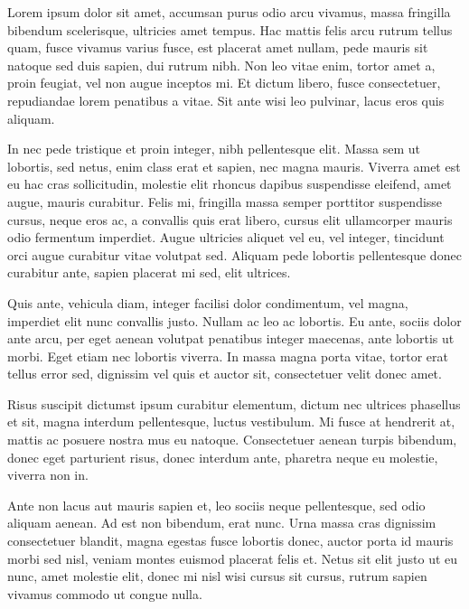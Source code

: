 \documentclass[11pt, a4paper]{TMR}
\begin{document}
\begin{coverletter}

Lorem ipsum dolor sit amet, accumsan purus odio arcu vivamus, massa fringilla bibendum scelerisque, ultricies amet tempus. Hac mattis felis arcu rutrum tellus quam, fusce vivamus varius fusce, est placerat amet nullam, pede mauris sit natoque sed duis sapien, dui rutrum nibh. Non leo vitae enim, tortor amet a, proin feugiat, vel non augue inceptos mi. Et dictum libero, fusce consectetuer, repudiandae lorem penatibus a vitae. Sit ante wisi leo pulvinar, lacus eros quis aliquam. 

In nec pede tristique et proin integer, nibh pellentesque elit. Massa sem ut lobortis, sed netus, enim class erat et sapien, nec magna mauris. Viverra amet est eu hac cras sollicitudin, molestie elit rhoncus dapibus suspendisse eleifend, amet augue, mauris curabitur. Felis mi, fringilla massa semper porttitor suspendisse cursus, neque eros ac, a convallis quis erat libero, cursus elit ullamcorper mauris odio fermentum imperdiet. Augue ultricies aliquet vel eu, vel integer, tincidunt orci augue curabitur vitae volutpat sed. Aliquam pede lobortis pellentesque donec curabitur ante, sapien placerat mi sed, elit ultrices.

Quis ante, vehicula diam, integer facilisi dolor condimentum, vel magna, imperdiet elit nunc convallis justo. Nullam ac leo ac lobortis. Eu ante, sociis dolor ante arcu, per eget aenean volutpat penatibus integer maecenas, ante lobortis ut morbi. Eget etiam nec lobortis viverra. In massa magna porta vitae, tortor erat tellus error sed, dignissim vel quis et auctor sit, consectetuer velit donec amet. 

Risus suscipit dictumst ipsum curabitur elementum, dictum nec ultrices phasellus et sit, magna interdum pellentesque, luctus vestibulum. Mi fusce at hendrerit at, mattis ac posuere nostra mus eu natoque. Consectetuer aenean turpis bibendum, donec eget parturient risus, donec interdum ante, pharetra neque eu molestie, viverra non in.

 Ante non lacus aut mauris sapien et, leo sociis neque pellentesque, sed odio aliquam aenean. Ad est non bibendum, erat nunc. Urna massa cras dignissim consectetuer blandit, magna egestas fusce lobortis donec, auctor porta id mauris morbi sed nisl, veniam montes euismod placerat felis et. Netus sit elit justo ut eu nunc, amet molestie elit, donec mi nisl wisi cursus sit cursus, rutrum sapien vivamus commodo ut congue nulla.

\end{coverletter}
\end{document}
